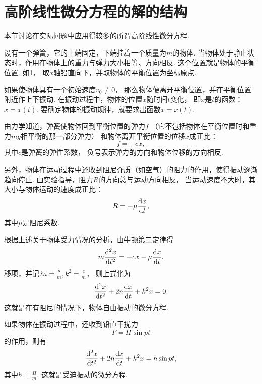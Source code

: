 \section{高阶线性微分方程的解的结构}
本节讨论在实际问题中应用得较多的所谓高阶线性微分方程.

\begin{figure}[htb]
	\centering
	\caption{}
	\label{figure:微分方程.重力场中的弹簧振子模型}
\end{figure}
\begin{example}
设有一个弹簧，它的上端固定，下端挂着一个质量为\(m\)的物体.
当物体处于静止状态时，作用在物体上的重力与弹力大小相等、方向相反.
这个位置就是物体的平衡位置.
如\cref{figure:微分方程.重力场中的弹簧振子模型}，
取\(x\)轴铅直向下，并取物体的平衡位置为坐标原点.

如果使物体具有一个初始速度\(v_0\neq0\)，
那么物体便离开平衡位置，并在平衡位置附近作上下振动.
在振动过程中，物体的位置\(x\)随时间\(t\)变化，
即\(x\)是\(t\)的函数：\(x=x(t)\).
要确定物体的振动规律，就要求出函数\(x=x(t)\).

由力学知道，弹簧使物体回到平衡位置的弹力\(f\)
（它不包括物体在平衡位置时和重力\(mg\)相平衡的那一部分弹力）
和物体离开平衡位置的位移\(x\)成正比：\[
	f = -cx,
\]
其中\(c\)是弹簧的弹性系数，
负号表示弹力的方向和物体位移的方向相反.

另外，物体在运动过程中还收到阻尼介质（如空气）的阻力的作用，使得振动逐渐趋向停止.
由实验指导，阻力\(R\)的方向总与运动方向相反，
当运动速度不大时，其大小与物体运动的速度成正比：\[
	R = -\mu \dv{x}{t},
\]
其中\(\mu\)是阻尼系数.

根据上述关于物体受力情况的分析，由牛顿第二定律得\[
	m \dv[2]{x}{t} = -cx -\mu \dv{x}{t}.
\]
移项，并记\(2n=\frac{\mu}{m},
k^2=\frac{c}{m}\)，
则上式化为\[
	\dv[2]{x}{t}+2n\dv{x}{t}+k^2x=0.
\]
这就是在有阻尼的情况下，物体自由振动的微分方程.

如果物体在振动过程中，还收到铅直干扰力\[
	F = H \sin pt
\]的作用，则有\[
	\dv[2]{x}{t} + 2n \dv{x}{t} + k^2x = h \sin pt,
\]
其中\(h=\frac{H}{m}\).
这就是受迫振动的微分方程.
\end{example}

